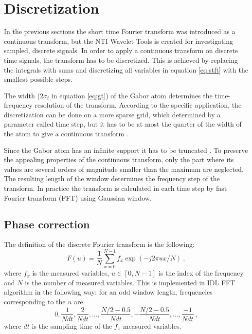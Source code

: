 \documentclass[a4paper,12pt,oneside]{article}
\begin{document}
\section{Discretization}

In the previous sections the short time Fourier transform was introduced as a continuous transform, but the NTI Wavelet Tools is created for investigating sampled, discrete signals. In order to apply a continuous transform on discrete time signals, the transform has to be discretized. This is achieved by replacing the integrals with sums and discretizing all variables in equation \eqref{eq:stft} with the smallest possible steps.

The width ($2 \sigma_t$ in equation \eqref{eq:gt}) of the Gabor atom determines the time-frequency resolution of the transform. According to the specific application, the discretization can be done on a more sparse grid, which determined by a parameter called time step, but it has to be at most the quarter of the width of the atom to give a continuous transform \cite{pokol2007application}.

Since the Gabor atom has an infinite support it has to be truncated \cite{pokol2007application}. To preserve the appealing properties of the continuous transform, only the part where its values are several orders of magnitude smaller than the maximum are neglected. The resulting length of the window determines the frequency step of the transform. In practice the transform is calculated in each time step by fast Fourier transform (FFT) using Gaussian window.

\subsection{Phase correction}

The definition of the discrete Fourier transform \cite{mallat08wavelet} is the following:
\begin{equation}\label{eq:fft_idl}
  F(u) = \frac{1}{N} \sum\limits_{x=0}^{N-1} f_x \exp(-j2\pi ux/N) \ ,
\end{equation}
where $f_x$ is the measured variables, $u \in [0, N-1]$ is the index of the frequency and $N$ is the number of measured variables. This is implemented in IDL\cite{idl12} FFT algorithm in the following way: for an odd window length, frequencies corresponding to the $u$ are
\begin{equation}\label{eq:frequencies}
  0, \frac{1}{Ndt}, \frac{2}{Ndt}, \dots, \frac{N/2-0.5}{Ndt}, -\frac{N/2-0.5}{Ndt}, \dots, \frac{-1}{Ndt} \ ,
\end{equation}
where $dt$ is the sampling time of the $f_x$ measured variables.
\end{document}
